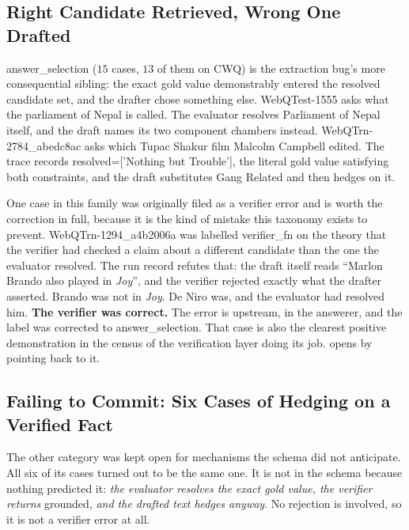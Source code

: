 \subsection{Right Candidate Retrieved, Wrong One
Drafted}\label{sec:answer-selection}

\textsf{answer\_selection} ($15$ cases, $13$ of them on CWQ) is the extraction
bug's more consequential sibling: the exact gold value demonstrably entered the
resolved candidate set, and the drafter chose something else.
\textsf{WebQTest-1555} asks what the parliament of Nepal is called. The
evaluator resolves \textsf{Parliament of Nepal} itself, and the draft names its
two component chambers instead. \textsf{WebQTrn-2784\_abedc8ac} asks which Tupac
Shakur film Malcolm Campbell edited. The trace records
\textsf{resolved=['Nothing but Trouble']}, the literal gold value satisfying
both constraints, and the draft substitutes \textsf{Gang Related} and then
hedges on it.

One case in this family was originally filed as a verifier error and is worth
the correction in full, because it is the kind of mistake this taxonomy exists
to prevent. \textsf{WebQTrn-1294\_a4b2006a} was labelled \textsf{verifier\_fn}
on the theory that the verifier had checked a claim about a different candidate
than the one the evaluator resolved. The run record refutes that: the draft
itself reads ``Marlon Brando also played in \emph{Joy}'', and the verifier
rejected exactly what the drafter asserted. Brando was not in \emph{Joy}. De
Niro was, and the evaluator had resolved him. \textbf{The verifier was correct.}
The error is upstream, in the answerer, and the label was corrected to
\textsf{answer\_selection}. That case is also the clearest positive
demonstration in the census of the verification layer doing its job.
 opens by pointing back to it.

\subsection{Failing to Commit: Six Cases of Hedging on a Verified Fact}

The \textsf{other} category was kept open for mechanisms the schema did
not anticipate. All six of its cases turned out to be the same one.
It is not in the schema because nothing predicted it: \emph{the evaluator
resolves the exact gold value, the verifier returns} \textsf{grounded},
\emph{and the drafted text hedges anyway}. No rejection is involved, so it is
not a verifier error at all.

